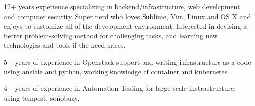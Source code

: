 

\begin{cvparagraph}

12+ years experience specializing in backend/infrastructure,
web development and computer security. Super nerd who loves Sublime, Vim,
Linux and OS X and enjoys to customize all of the development environment.
Interested in devising a better problem-solving method for challenging tasks,
and learning new technologies and tools if the need arises.

5+ years of experience in Openstack support and writing infrastructure as a code
using ansible and python, working knowledge of container and kubernetes

4+ years of experience in Automation Testing for large scale instrastructure, using  tempest, sonobuoy.
\end{cvparagraph}


